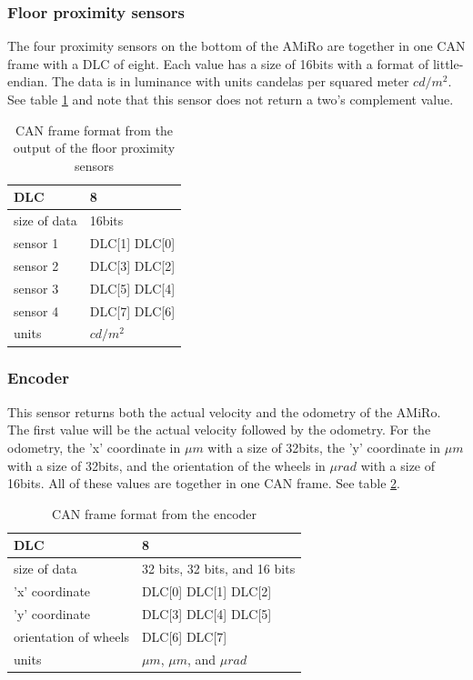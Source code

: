 \documentclass[12pt]{report}%
\begin{document}
\subsubsection{Floor proximity sensors}
The four proximity sensors on the bottom of the AMiRo are together in one CAN frame with a DLC of eight. Each value has a size of 16bits with a format of little-endian. The data is in luminance with units candelas per squared meter $cd/m^2$. See table \ref{tab:floorprox} and note that this sensor does not return a two's complement value.

\begin{table}[h!]
\centering
\begin{tabular}{|l|l|}
	\hline
	DLC						&	8													\\	\hline
	size of data	&	16bits										\\	\hline
	sensor 1			&	DLC[1] DLC[0]							\\	\hline
  sensor 2			&	DLC[3] DLC[2]							\\	\hline
	sensor 3			&	DLC[5] DLC[4]							\\	\hline
	sensor 4			&	DLC[7] DLC[6]							\\	\hline
	units					&	$cd/m^2$									\\	\hline
\end{tabular}
\caption{\label{tab:floorprox} CAN frame format from the output of the floor proximity sensors}
\end{table}

\subsubsection{Encoder}
This sensor returns both the actual velocity and the odometry of the AMiRo. The first value will be the actual velocity followed by the odometry. For the odometry, the 'x' coordinate in $\mu m$ with a size of 32bits, the 'y' coordinate in $\mu m$ with a size of 32bits, and the orientation of the wheels in $\mu rad$ with a size of 16bits. All of these values are together in one CAN frame. See table \ref{tab:encoder}.

\begin{table}[h!]
\centering
\begin{tabular}{|l|l|}
	\hline
	DLC										&	8																\\	\hline
	size of data					&	32 bits, 32 bits, and 16 bits		\\	\hline
	'x' coordinate				&	DLC[0] DLC[1] DLC[2] 						\\	\hline
	'y'	coordinate				&	DLC[3] DLC[4] DLC[5] 						\\	\hline
	orientation of wheels	&	DLC[6] DLC[7] 									\\	\hline
	units									&	$\mu m$, $\mu m$, and $\mu rad$	\\	\hline
\end{tabular}
\caption{\label{tab:encoder} CAN frame format from the encoder}
\end{table}
\end{document}
